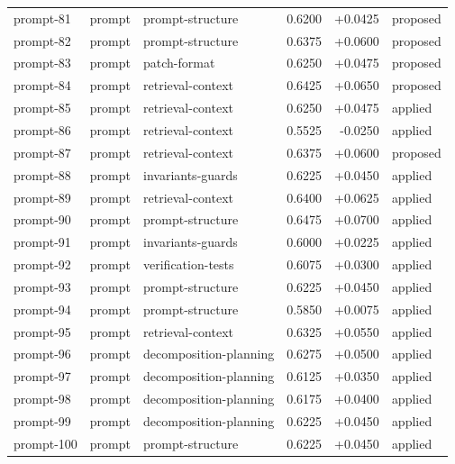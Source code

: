\begin{center}
\begin{longtable}{llp{5.2cm}rrl}
prompt-81 & prompt & prompt-structure & 0.6200 & +0.0425 & proposed \\
prompt-82 & prompt & prompt-structure & 0.6375 & +0.0600 & proposed \\
prompt-83 & prompt & patch-format & 0.6250 & +0.0475 & proposed \\
prompt-84 & prompt & retrieval-context & 0.6425 & +0.0650 & proposed \\
prompt-85 & prompt & retrieval-context & 0.6250 & +0.0475 & applied \\
prompt-86 & prompt & retrieval-context & 0.5525 & -0.0250 & applied \\
prompt-87 & prompt & retrieval-context & 0.6375 & +0.0600 & proposed \\
prompt-88 & prompt & invariants-guards & 0.6225 & +0.0450 & applied \\
prompt-89 & prompt & retrieval-context & 0.6400 & +0.0625 & applied \\
prompt-90 & prompt & prompt-structure & 0.6475 & +0.0700 & applied \\
prompt-91 & prompt & invariants-guards & 0.6000 & +0.0225 & applied \\
prompt-92 & prompt & verification-tests & 0.6075 & +0.0300 & applied \\
prompt-93 & prompt & prompt-structure & 0.6225 & +0.0450 & applied \\
prompt-94 & prompt & prompt-structure & 0.5850 & +0.0075 & applied \\
prompt-95 & prompt & retrieval-context & 0.6325 & +0.0550 & applied \\
prompt-96 & prompt & decomposition-planning & 0.6275 & +0.0500 & applied \\
prompt-97 & prompt & decomposition-planning & 0.6125 & +0.0350 & applied \\
prompt-98 & prompt & decomposition-planning & 0.6175 & +0.0400 & applied \\
prompt-99 & prompt & decomposition-planning & 0.6225 & +0.0450 & applied \\
prompt-100 & prompt & prompt-structure & 0.6225 & +0.0450 & applied \\
\bottomrule\end{longtable}\end{center}
\clearpage
